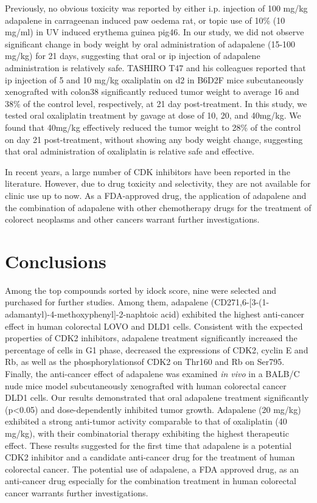 Previously, no obvious toxicity was reported by either i.p. injection of 100 mg/kg adapalene in carrageenan induced paw oedema rat, or topic use of 10\% (10 mg/ml) in UV induced erythema guinea pig46. In our study, we did not observe significant change in body weight by oral administration of adapalene (15-100 mg/kg) for 21 days, suggesting that oral or ip injection of adapalene administration is relatively safe. TASHIRO T47 and his colleagues reported that ip injection of 5 and 10 mg/kg oxaliplatin on d2 in B6D2F mice subcutaneously xenografted with colon38 significantly reduced tumor weight to average 16 and 38\% of the control level, respectively, at 21 day post-treatment. In this study, we tested oral oxaliplatin treatment by gavage at dose of 10, 20, and 40mg/kg. We found that 40mg/kg effectively reduced the tumor weight to 28\% of the control on day 21 post-treatment, without showing any body weight change, suggesting that oral administration of oxaliplatin is relative safe and effective.

In recent years, a large number of CDK inhibitors have been reported in the literature. However, due to drug toxicity and selectivity, they are not available for clinic use up to now. As a FDA-approved drug, the application of adapalene and the combination of adapalene with other chemotherapy drugs for the treatment of colorect neoplasms and other cancers warrant further investigations.

\section{Conclusions}

Among the top compounds sorted by idock score, nine were selected and purchased for further studies. Among them, adapalene (CD271,6-[3-(1-adamantyl)-4-methoxyphenyl]-2-naphtoic acid) exhibited the highest anti-cancer effect in human colorectal LOVO and DLD1 cells. Consistent with the expected properties of CDK2 inhibitors, adapalene treatment significantly increased the percentage of cells in G1 phase, decreased the expressions of CDK2, cyclin E and Rb, as well as the phosphorylationsof CDK2 on Thr160 and Rb on Ser795. Finally, the anti-cancer effect of adapalene was examined \textit{in vivo} in a BALB/C nude mice model subcutaneously xenografted with human colorectal cancer DLD1 cells. Our results demonstrated that oral adapalene treatment significantly (p<0.05) and dose-dependently inhibited tumor growth. Adapalene (20 mg/kg) exhibited a strong anti-tumor activity comparable to that of oxaliplatin (40 mg/kg), with their combinatorial therapy exhibiting the highest therapeutic effect. These results suggested for the first time that adapalene is a potential CDK2 inhibitor and a candidate anti-cancer drug for the treatment of human colorectal cancer. The potential use of adapalene, a FDA approved drug, as an anti-cancer drug especially for the combination treatment in human colorectal cancer warrants further investigations.

\chapterend
